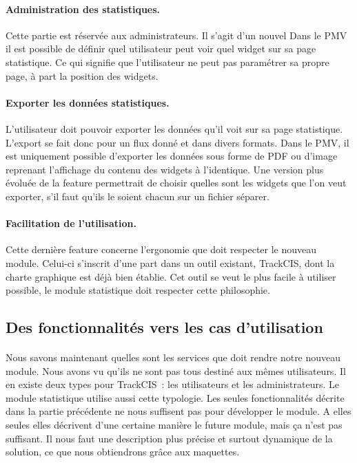 			\paragraph{Administration des statistiques.}
			Cette partie est réservée aux administrateurs. Il s'agit d'un nouvel Dans le
			PMV il est possible de définir quel utilisateur peut voir quel widget sur sa
			page statistique. Ce qui signifie que l'utilisateur ne peut pas paramétrer
			sa propre page, à part la position des widgets.
			
			\paragraph{Exporter les données statistiques.}
			L'utilisateur doit pouvoir exporter les données qu'il voit sur sa page
			statistique. L'export se fait donc pour un flux donné et dans divers formats.
			Dans le PMV, il est uniquement possible d'exporter les données sous forme de
			PDF ou d'image reprenant l'affichage du contenu des widgets à l'identique.
			Une version plus évoluée de la feature permettrait de choisir quelles sont
			les widgets que l'on veut exporter, s'il faut qu'ils le soient chacun sur un
			fichier séparer.
			
			\paragraph{Facilitation de l’utilisation.}
			Cette dernière feature concerne l'ergonomie que doit respecter le nouveau
			module. Celui-ci s'inscrit d'une part dans un outil existant, TrackCIS, dont
			la charte graphique est déjà bien établie. Cet outil se veut le plus facile à
			utiliser possible, le module statistique doit respecter cette philosophie.
	
	\subsection{Des fonctionnalités vers les cas d'utilisation}
		\paragraph{}
		Nous savons maintenant quelles sont les services que doit rendre notre nouveau
		module. Nous avons vu qu'ils ne sont pas tous destiné aux mêmes utilisateurs.
		Il en existe deux types pour TrackCIS~: les utilisateurs et les
		administrateurs. Le module statistique utilise aussi cette typologie. Les
		seules fonctionnalités décrite dans la partie précédente ne nous suffisent
		pas pour développer le module. A elles seules elles décrivent d'une certaine
		manière le future module, mais ça n'est pas suffisant. Il nous faut une
		description plus précise et surtout dynamique de la solution, ce que nous
		obtiendrons grâce aux maquettes.
		
